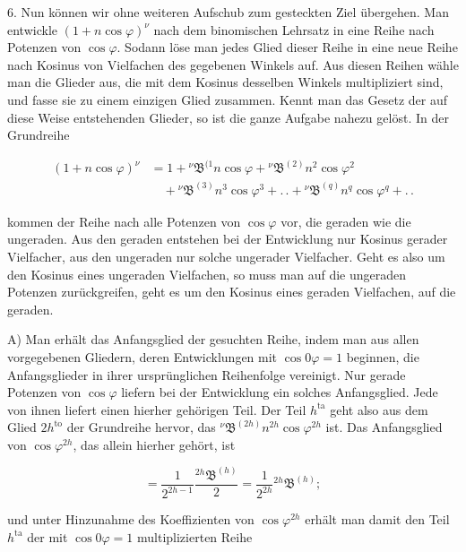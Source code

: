 \par\noindent{}%
\hspace*{\parindent}6. Nun können wir ohne weiteren Aufschub zum gesteckten Ziel übergehen. Man entwickle $(1+n\cos\varphi)^{\nu}$ nach dem binomischen Lehrsatz in eine Reihe nach Potenzen von $\cos\varphi$. Sodann löse man jedes Glied dieser Reihe in eine neue Reihe nach Kosinus von Vielfachen des gegebenen Winkels auf. Aus diesen Reihen wähle man die Glieder aus, die mit dem Kosinus desselben Winkels multipliziert sind, und fasse sie zu einem einzigen Glied zusammen. Kennt man das Gesetz der auf diese Weise entstehenden Glieder, so ist die ganze Aufgabe nahezu gelöst. In der Grundreihe

\[
\begin{aligned}
(1+n\cos\varphi)^{\nu} & = 1 + {}^{\nu}\mathfrak{B}^{(1} n\cos\varphi + {}^{\nu}\mathfrak{B}^{(2)} n^{2}\cos\varphi^{2} \\&\quad + {}^{\nu}\mathfrak{B}^{(3)} n^{3}\cos\varphi^{3} + .\,. + {}^{\nu}\mathfrak{B}^{(q)} n^{q}\cos\varphi^{q} + .\,.
\end{aligned}
\]

\noindent kommen der Reihe nach alle Potenzen von $\cos\varphi$ vor, die geraden wie die ungeraden. Aus den geraden entstehen bei der Entwicklung nur Kosinus gerader Vielfacher, aus den ungeraden nur solche ungerader Vielfacher. Geht es also um den Kosinus eines ungeraden Vielfachen, so muss man auf die ungeraden Potenzen zurückgreifen, geht es um den Kosinus eines geraden Vielfachen, auf die geraden.

A) Man erhält das Anfangsglied der gesuchten Reihe, indem man aus allen vorgegebenen Gliedern, deren Entwicklungen mit $\cos 0\varphi = 1$ beginnen, die Anfangsglieder in ihrer ursprünglichen Reihenfolge vereinigt. Nur gerade Potenzen von $\cos\varphi$ liefern bei der Entwicklung ein solches Anfangsglied. Jede von ihnen liefert einen hierher gehörigen Teil. Der Teil $h^{\text{ta}}$ geht also aus dem Glied $2h^{\text{to}}$ der Grundreihe hervor, das ${}^{\nu}\mathfrak{B}^{(2h)} n^{2h}\cos\varphi^{2h}$ ist. Das Anfangsglied von $\cos\varphi^{2h}$, das allein hierher gehört, ist

\[
= \frac{1}{2^{2h-1}} \frac{{}^{2h}\mathfrak{B}^{(h)}}{2} = \frac{1}{2^{2h}} {}^{2h}\mathfrak{B}^{(h)};
\]

\noindent und unter Hinzunahme des Koeffizienten von $\cos\varphi^{2h}$ erhält man damit den Teil $h^{\text{ta}}$ der mit $\cos 0\varphi = 1$ multiplizierten Reihe

